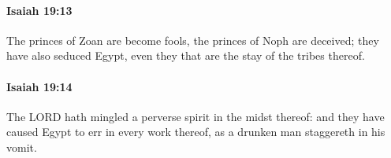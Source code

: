 		\paragraph{Isaiah 19:13} %
			\label{ISAIAH-19-13}

			The princes of Zoan are become fools, the princes of Noph are deceived; they have also seduced Egypt, even they that are the stay of the tribes thereof.


		\paragraph{Isaiah 19:14} %
			\label{ISAIAH-19-14}

			The LORD hath mingled a perverse spirit in the midst thereof: and they have caused Egypt to err in every work thereof, as a drunken man staggereth in his vomit.


